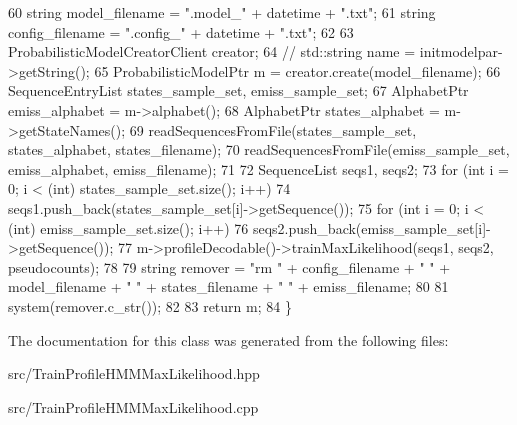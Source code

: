 \begin{DoxyCode}
60     \textcolor{keywordtype}{string} model\_filename = \textcolor{stringliteral}{".model\_"} + datetime + \textcolor{stringliteral}{".txt"};
61     \textcolor{keywordtype}{string} config\_filename = \textcolor{stringliteral}{".config\_"} + datetime + \textcolor{stringliteral}{".txt"};
62 
63     ProbabilisticModelCreatorClient creator;
64 \textcolor{comment}{//    std::string name = initmodelpar->getString();}
65     ProbabilisticModelPtr m = creator.create(model\_filename);
66     SequenceEntryList states\_sample\_set, emiss\_sample\_set;
67     AlphabetPtr emiss\_alphabet = m->alphabet();
68     AlphabetPtr states\_alphabet = m->getStateNames();
69     readSequencesFromFile(states\_sample\_set, states\_alphabet, states\_filename);
70     readSequencesFromFile(emiss\_sample\_set, emiss\_alphabet, emiss\_filename);
71 
72     SequenceList seqs1, seqs2;
73     \textcolor{keywordflow}{for} (\textcolor{keywordtype}{int} i = 0; i < (int) states\_sample\_set.size(); i++)
74         seqs1.push\_back(states\_sample\_set[i]->getSequence());
75     \textcolor{keywordflow}{for} (\textcolor{keywordtype}{int} i = 0; i < (int) emiss\_sample\_set.size(); i++)
76         seqs2.push\_back(emiss\_sample\_set[i]->getSequence());
77     m->profileDecodable()->trainMaxLikelihood(seqs1, seqs2, pseudocounts);
78 
79     \textcolor{keywordtype}{string} remover = \textcolor{stringliteral}{"rm "} + config\_filename + \textcolor{stringliteral}{" "} + model\_filename + \textcolor{stringliteral}{" "} + states\_filename + \textcolor{stringliteral}{" "} + 
      emiss\_filename;
80 
81     system(remover.c\_str());
82 
83     \textcolor{keywordflow}{return} m;
84 \}
\end{DoxyCode}


The documentation for this class was generated from the following files\+:\begin{DoxyCompactItemize}
\item 
src/Train\+Profile\+H\+M\+M\+Max\+Likelihood.\+hpp\item 
src/Train\+Profile\+H\+M\+M\+Max\+Likelihood.\+cpp\end{DoxyCompactItemize}
